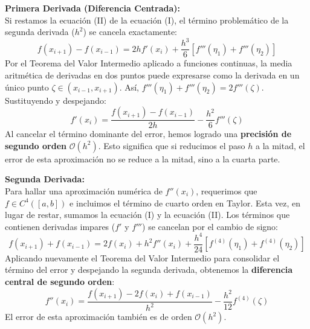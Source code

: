 \textbf{Primera Derivada (Diferencia Centrada):}\\
Si restamos la ecuación (II) de la ecuación (I), el término problemático de la segunda derivada ($h^2$) se cancela exactamente:
\[
    f(x_{i+1}) - f(x_{i-1}) = 2 h f'(x_i) + \frac{h^3}{6} \left[ f'''(\eta_1) + f'''(\eta_2) \right]
\]
Por el Teorema del Valor Intermedio aplicado a funciones continuas, la media aritmética de derivadas en dos puntos puede expresarse como la derivada en un único punto $\zeta \in (x_{i-1}, x_{i+1})$. Así, $f'''(\eta_1) + f'''(\eta_2) = 2 f'''(\zeta)$. Sustituyendo y despejando:
\[
    \boxed{ f'(x_i) = \frac{f(x_{i+1}) - f(x_{i-1})}{2h} - \frac{h^2}{6} f'''(\zeta) }
\]
Al cancelar el término dominante del error, hemos logrado una \textbf{precisión de segundo orden} $\mathcal{O}(h^2)$. Esto significa que si reducimos el paso $h$ a la mitad, el error de esta aproximación no se reduce a la mitad, sino a la cuarta parte.

\vspace{0.5cm}
\textbf{Segunda Derivada:}\\
Para hallar una aproximación numérica de $f''(x_i)$, requerimos que $f \in C^4([a,b])$ e incluimos el término de cuarto orden en Taylor. Esta vez, en lugar de restar, sumamos la ecuación (I) y la ecuación (II). Los términos que contienen derivadas impares ($f'$ y $f'''$) se cancelan por el cambio de signo:
\[
    f(x_{i+1}) + f(x_{i-1}) = 2 f(x_i) + h^2 f''(x_i) + \frac{h^4}{24} \left[ f^{(4)}(\eta_1) + f^{(4)}(\eta_2) \right]
\]
Aplicando nuevamente el Teorema del Valor Intermedio para consolidar el término del error y despejando la segunda derivada, obtenemos la \textbf{diferencia central de segundo orden}:
\[
    \boxed{ f''(x_i) = \frac{f(x_{i+1}) - 2 f(x_i) + f(x_{i-1})}{h^2} - \frac{h^2}{12} f^{(4)}(\zeta) }
\]
El error de esta aproximación también es de orden $\mathcal{O}(h^2)$.

